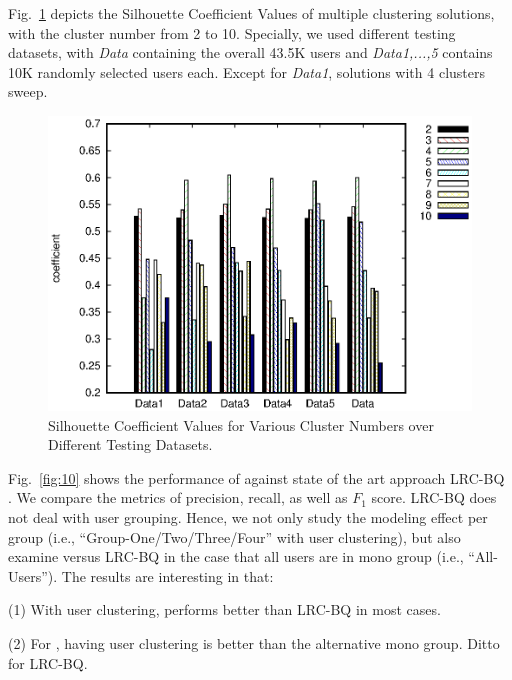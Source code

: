 %
Fig.\ \ref{fig:uc} depicts the Silhouette Coefficient Values of multiple clustering solutions, with the cluster number from 2 to 10.
Specially, we used different testing datasets, with \textit{Data} containing the overall 43.5K users and \textit{Data1,...,5} contains 10K randomly selected users each.
Except for \textit{Data1}, solutions with 4 clusters sweep.

\begin{figure}[!htb]
\centering
\includegraphics[width=.85\linewidth]{figures/clustering}
\caption{Silhouette Coefficient Values for Various Cluster Numbers over Different Testing Datasets.}
\label{fig:uc}
\end{figure}


%
Fig.\ \ref{fig:10} shows the performance of \sys{} against state of the art approach LRC-BQ \cite{IEEEexample:conf/ijcai/ZhangLTCL13}.
We compare the metrics of precision, recall, as well as $F_1$ score.
LRC-BQ does not deal with user grouping.
Hence, we not only study the modeling effect per group (i.e., ``Group-One/Two/Three/Four'' with user clustering), but also examine \sys{} versus LRC-BQ in the case that all users are in mono group (i.e., ``All-Users'').
The results are interesting in that:

	\stab(1) With user clustering, \sys{} performs better than LRC-BQ in most cases.
	
	\stab(2) For \sys{}, having user clustering is better than the alternative mono group. Ditto for LRC-BQ.



